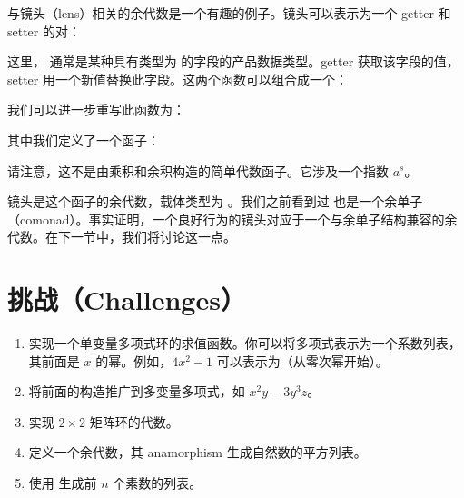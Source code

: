 与镜头（lens）相关的余代数是一个有趣的例子。镜头可以表示为一个 getter 和 setter 的对：

这里， 通常是某种具有类型为  的字段的产品数据类型。getter 获取该字段的值，setter 用一个新值替换此字段。这两个函数可以组合成一个：

我们可以进一步重写此函数为：

其中我们定义了一个函子：

请注意，这不是由乘积和余积构造的简单代数函子。它涉及一个指数 $a^s$。

镜头是这个函子的余代数，载体类型为 。我们之前看到过  也是一个余单子（comonad）。事实证明，一个良好行为的镜头对应于一个与余单子结构兼容的余代数。在下一节中，我们将讨论这一点。

\section{挑战（Challenges）}

\begin{enumerate}
  \tightlist
  \item
  实现一个单变量多项式环的求值函数。你可以将多项式表示为一个系数列表，其前面是 $x$ 的幂。例如，$4x^2-1$ 可以表示为（从零次幂开始）\code{{[}-1, 0, 4{]}}。
  \item
  将前面的构造推广到多变量多项式，如 $x^2y-3y^3z$。
  \item
  实现 $2\times{}2$ 矩阵环的代数。
  \item
  定义一个余代数，其 anamorphism 生成自然数的平方列表。
  \item
  使用  生成前 $n$ 个素数的列表。
\end{enumerate}
